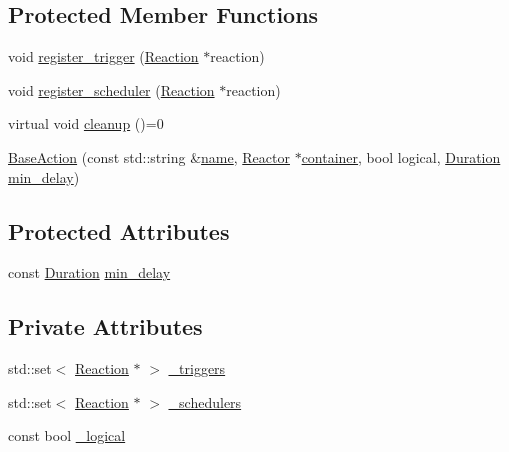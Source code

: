 \subsection*{Protected Member Functions}
\begin{DoxyCompactItemize}
\item 
void \hyperlink{classreactor_1_1BaseAction_a8ee41c1fd582f54518b6ca06b95a54ad}{register\+\_\+trigger} (\hyperlink{classreactor_1_1Reaction}{Reaction} $\ast$reaction)
\item 
void \hyperlink{classreactor_1_1BaseAction_a5cde20240a08d79c6c826d97f9a7f916}{register\+\_\+scheduler} (\hyperlink{classreactor_1_1Reaction}{Reaction} $\ast$reaction)
\item 
virtual void \hyperlink{classreactor_1_1BaseAction_a7e4ad7157e653054c7afa22b78e46923}{cleanup} ()=0
\item 
\hyperlink{classreactor_1_1BaseAction_a94dadf5eacb10e4e1d7bc99e53ac8599}{Base\+Action} (const std\+::string \&\hyperlink{classreactor_1_1ReactorElement_a99579f61dbaf5d5d98aebfe26eb8bf77}{name}, \hyperlink{classreactor_1_1Reactor}{Reactor} $\ast$\hyperlink{classreactor_1_1ReactorElement_a25bf298de879a82eefc1ba426be05812}{container}, bool logical, \hyperlink{namespacereactor_aa8375b807a80703545664096c5b5b779}{Duration} \hyperlink{classreactor_1_1BaseAction_a98201db474f34cb9e38151a6960128f0}{min\+\_\+delay})
\end{DoxyCompactItemize}
\subsection*{Protected Attributes}
\begin{DoxyCompactItemize}
\item 
const \hyperlink{namespacereactor_aa8375b807a80703545664096c5b5b779}{Duration} \hyperlink{classreactor_1_1BaseAction_a98201db474f34cb9e38151a6960128f0}{min\+\_\+delay}
\end{DoxyCompactItemize}
\subsection*{Private Attributes}
\begin{DoxyCompactItemize}
\item 
std\+::set$<$ \hyperlink{classreactor_1_1Reaction}{Reaction} $\ast$ $>$ \hyperlink{classreactor_1_1BaseAction_a90990090bd60f27c66b0cc7ddbc03b6e}{\+\_\+triggers}
\item 
std\+::set$<$ \hyperlink{classreactor_1_1Reaction}{Reaction} $\ast$ $>$ \hyperlink{classreactor_1_1BaseAction_a90459f877f25a143d9ad8c2fec8a402c}{\+\_\+schedulers}
\item 
const bool \hyperlink{classreactor_1_1BaseAction_adfef875bcf82270932d2a8648ea78796}{\+\_\+logical}
\end{DoxyCompactItemize}
